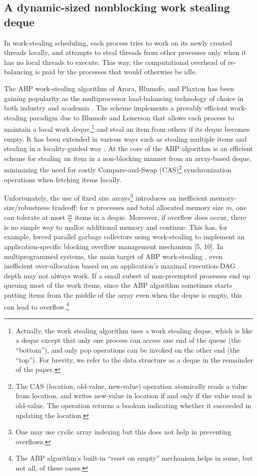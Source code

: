 \subsection{A dynamic-sized nonblocking work stealing deque
  \cite{Hendler2006, Hendler2006a}}

In work-stealing scheduling, each process tries to work on its newly
created threads locally, and attempts to steal threads from other
processes only when it has no local threads to execute. This way, the
computational overhead of re-balancing is paid by the processes that
would otherwise be idle.

The ABP work-stealing algorithm of Arora, Blumofe, and Plaxton
\cite{Arora2001} has been gaining popularity as the multiprocessor
load-balancing technology of choice in both industry and academia
\cite{Arora2001, Acar2002, Blumofe1995, Frigo1998, Danaher2005}. The
scheme implements a provably efficient work-stealing paradigm due to
Blumofe and Leiserson \cite{Blumofe1999} that allows each process to
maintain a local work deque,\footnote{Actually, the work stealing
  algorithm uses a work stealing deque, which is like a deque
  \cite{Knuth1997} except that only one process can access one end of
  the queue (the ``bottom''), and only pop operations can be invoked
  on the other end (the ``top''). For brevity, we refer to the data
  structure as a deque in the remainder of the paper.} and steal an
item from others if its deque becomes empty. It has been extended in
various ways such as stealing multiple items \cite{Hendler2002} and
stealing in a locality-guided way \cite{Acar2002}. At the core of the
ABP algorithm is an efficient scheme for stealing an item in a
non-blocking manner from an array-based deque, minimizing the need for
costly Compare-and-Swap (CAS)\footnote{The CAS (location, old-value,
  new-value) operation atomically reads a value from location, and
  writes new-value in location if and only if the value read is
  old-value. The operation returns a boolean indicating whether it
  succeeded in updating the location.} synchronization operations when
fetching items locally.

Unfortunately, the use of fixed size arrays\footnote{One may use
  cyclic array indexing but this does not help in preventing
  overflows.} introduces an inefficient memory-size/robustness
tradeoff: for $n$ processes and total allocated memory size $m$, one
can tolerate at most $\frac{m}{n}$ items in a deque. Moreover, if
overflow does occur, there is no simple way to malloc additional
memory and continue. This has, for example, forced parallel garbage
collectors using work-stealing to implement an application-specific
blocking overflow management mechanism [5, 10]. In multiprogrammed
systems, the main target of ABP work-stealing \cite{Arora2001}, even
inefficient over-allocation based on an application's maximal
execution-DAG depth \cite{Arora2001, Blumofe1999} may not always
work. If a small subset of non-preempted processes end up queuing most
of the work items, since the ABP algorithm sometimes starts putting
items from the middle of the array even when the deque is empty, this
can lead to overflow.\footnote{The ABP algorithm's built-in ``reset on
  empty'' mechanism helps in some, but not all, of these cases.}

